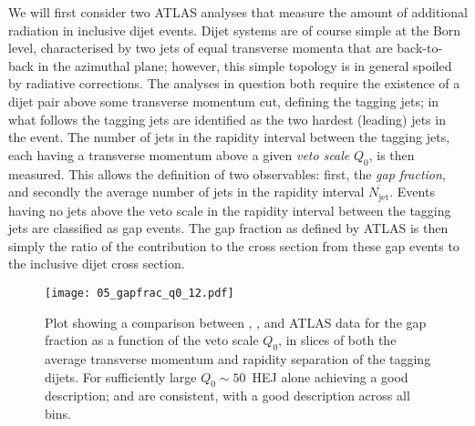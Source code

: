 We will first consider two ATLAS analyses \cite{Aad:2011jz,Aad:2014pua}
that measure the amount of additional radiation in inclusive dijet events. 
Dijet systems are of course simple
at the Born level, characterised by two jets of equal transverse momenta that are
back-to-back in the azimuthal plane; however, this simple topology is in
general spoiled by radiative corrections. 
The analyses in question both require the existence of a dijet pair above 
some transverse momentum cut, defining the tagging jets; in what follows 
the tagging jets are identified as the two hardest (leading) jets in the event.
The number of jets in the rapidity interval between the tagging 
jets, each having a transverse momentum above a given \textit{veto scale} $Q_0$,
is then measured. 
This allows the definition of two observables: first, the \textit{gap fraction}, 
and secondly the average number of jets in the rapidity interval $\overline{N_\mathrm{jet}}$.
Events having no jets above the veto scale in the rapidity interval between the tagging jets
are classified as gap events. The gap fraction as defined by ATLAS \cite{Aad:2011jz,Aad:2014pua}
is then simply the ratio of the contribution to the cross section from these gap events to 
the inclusive dijet cross section.



\begin{figure}[t]
  \centering
   \texttt{[image: 05\_gapfrac\_q0\_12.pdf]}
  \caption{Plot showing a comparison between \HEJ, \py, \HEJpy  and ATLAS data \cite{Aad:2011jz} for
  the gap fraction as a function of the veto scale $Q_0$, in slices of both the average transverse momentum and rapidity separation 
  of the tagging dijets.  For sufficiently large $Q_0\sim 50$\GeV\ HEJ alone
    achieving a good description; \py and \HEJpy are consistent, with a good description across all bins. 
    }
    \label{fig:gapfracb}
  \label{fig:gapfrac2}
\end{figure}

